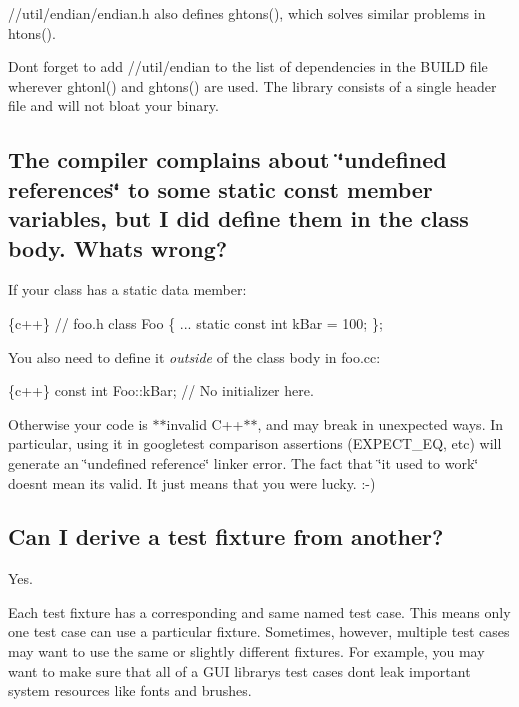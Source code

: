 {\ttfamily //util/endian/endian.h} also defines {\ttfamily ghtons()}, which solves similar problems in {\ttfamily htons()}.

Don\textquotesingle{}t forget to add {\ttfamily //util/endian} to the list of dependencies in the {\ttfamily B\+U\+I\+LD} file wherever {\ttfamily ghtonl()} and {\ttfamily ghtons()} are used. The library consists of a single header file and will not bloat your binary.

\subsection*{The compiler complains about \char`\"{}undefined references\char`\"{} to some static const member variables, but I did define them in the class body. What\textquotesingle{}s wrong?}

If your class has a static data member\+:


\begin{DoxyCode}
\{c++\}
// foo.h
class Foo \{
  ...
  static const int kBar = 100;
\};
\end{DoxyCode}


You also need to define it {\itshape outside} of the class body in {\ttfamily foo.\+cc}\+:


\begin{DoxyCode}
\{c++\}
const int Foo::kBar;  // No initializer here.
\end{DoxyCode}


Otherwise your code is $\ast$$\ast$invalid C++$\ast$$\ast$, and may break in unexpected ways. In particular, using it in googletest comparison assertions ({\ttfamily E\+X\+P\+E\+C\+T\+\_\+\+EQ}, etc) will generate an \char`\"{}undefined reference\char`\"{} linker error. The fact that \char`\"{}it used to work\char`\"{} doesn\textquotesingle{}t mean it\textquotesingle{}s valid. It just means that you were lucky. \+:-\/)

\subsection*{Can I derive a test fixture from another?}

Yes.

Each test fixture has a corresponding and same named test case. This means only one test case can use a particular fixture. Sometimes, however, multiple test cases may want to use the same or slightly different fixtures. For example, you may want to make sure that all of a G\+UI library\textquotesingle{}s test cases don\textquotesingle{}t leak important system resources like fonts and brushes.

